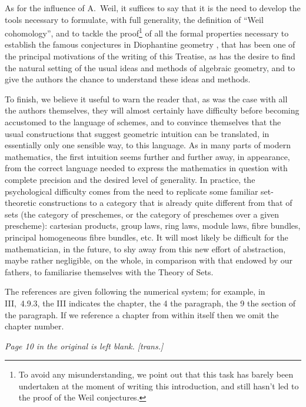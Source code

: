\documentclass[10pt,oneside]{book}
\begin{document}
As for the influence of A.~Weil, it suffices to say that it is the need to
develop the tools necessary to formulate, with full generality, the definition
of ``Weil cohomology'', and to tackle the proof\footnote{To avoid any
misunderstanding, we point out that this task has barely been undertaken at the
moment of writing this introduction, and still hasn't led to the proof of the
Weil conjectures.} of all the formal properties necessary to establish the
famous conjectures in Diophantine geometry \cite{19}, that has been one of the
principal motivations of the writing of this Treatise, as has the desire to find
the natural setting of the usual ideas and methods of algebraic geometry, and to
give the authors the chance to understand these ideas and methods.

\asttri

To finish, we believe it useful to warn the reader that, as was the case with
all the authors themselves, they will almost certainly have difficulty before
becoming accustomed to the language of schemes, and to convince themselves that
the usual constructions that suggest geometric intuition can be translated, in
essentially only one sensible way, to this language. As in many parts of modern
mathematics, the first intuition seems further and further away, in appearance,
from the correct language needed to express the mathematics in question with
complete precision and the desired level of generality. In practice, the
psychological difficulty comes from the need to replicate some familiar
set-theoretic constructions to a category that is already quite different from
that of sets (the category of preschemes, or the category of preschemes over a
given prescheme): cartesian products, group laws, ring laws, module laws, fibre
bundles, principal homogeneous fibre bundles, etc. It will most likely
be difficult for the mathematician, in the future, to shy away from this new
effort of abstraction, maybe rather negligible, on the whole, in comparison with
that endowed by our fathers, to familiarise themselves with the Theory of Sets.

\asttri

The references are given following the numerical system; for example, in
III,~4.9.3, the III indicates the chapter, the 4 the paragraph, the 9 the
section of the paragraph. If we reference a chapter from within itself then we
omit the chapter number.

\bigskip

\emph{Page 10 in the original is left blank. [trans.]}
\end{document}
